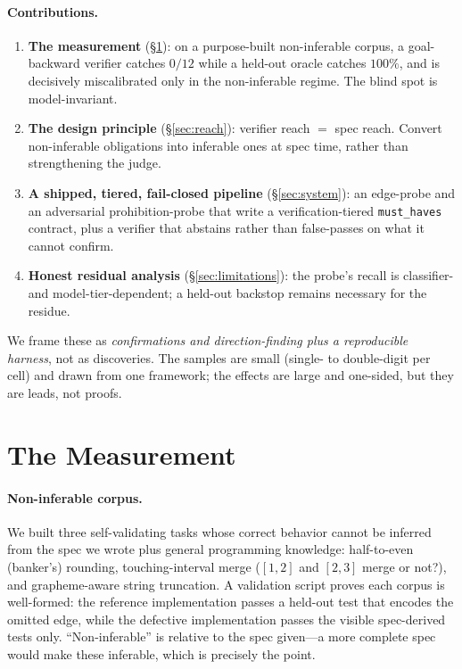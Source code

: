 \documentclass[11pt]{article}
\newcommand{\code}[1]{\texttt{#1}}
\begin{document}
\paragraph{Contributions.}
\begin{enumerate}[leftmargin=1.4em,itemsep=2pt]
\item \textbf{The measurement} (\S\ref{sec:measurement}): on a purpose-built non-inferable corpus, a
goal-backward verifier catches $0/12$ while a held-out oracle catches $100\%$, and is decisively
miscalibrated only in the non-inferable regime. The blind spot is model-invariant.
\item \textbf{The design principle} (\S\ref{sec:reach}): verifier reach $=$ spec reach. Convert
non-inferable obligations into inferable ones at spec time, rather than strengthening the judge.
\item \textbf{A shipped, tiered, fail-closed pipeline} (\S\ref{sec:system}): an edge-probe and an
adversarial prohibition-probe that write a verification-tiered \code{must\_haves} contract, plus a
verifier that abstains rather than false-passes on what it cannot confirm.
\item \textbf{Honest residual analysis} (\S\ref{sec:limitations}): the probe's recall is
classifier- and model-tier-dependent; a held-out backstop remains necessary for the residue.
\end{enumerate}

We frame these as \emph{confirmations and direction-finding plus a reproducible harness}, not as
discoveries. The samples are small (single- to double-digit per cell) and drawn from one framework;
the effects are large and one-sided, but they are leads, not proofs.

\section{The Measurement}
\label{sec:measurement}

\paragraph{Non-inferable corpus.} We built three self-validating tasks whose correct behavior cannot
be inferred from the spec we wrote plus general programming knowledge: half-to-even (banker's)
rounding, touching-interval merge ($[1,2]$ and $[2,3]$ merge or not?), and grapheme-aware string
truncation. A validation script proves each corpus is well-formed: the reference implementation
passes a held-out test that encodes the omitted edge, while the defective implementation passes the
visible spec-derived tests only. ``Non-inferable'' is relative to the spec given---a more complete
spec would make these inferable, which is precisely the point.
\end{document}
